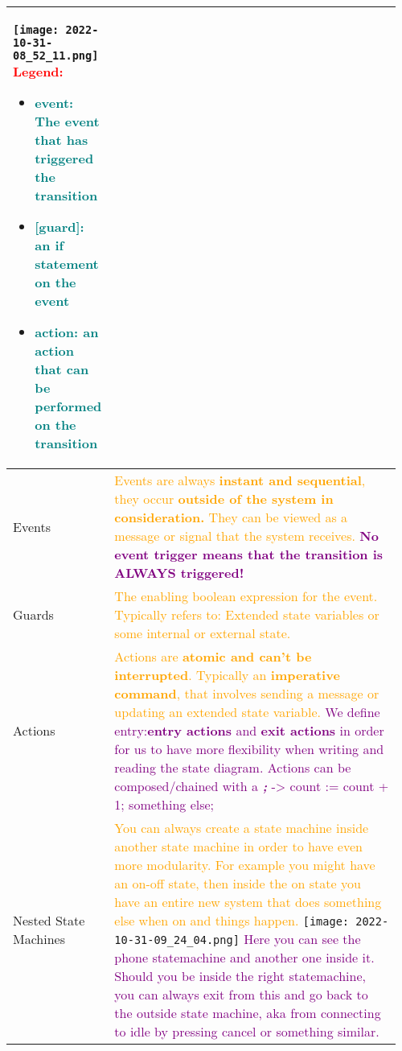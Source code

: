 \documentclass[main.tex,fontsize=8pt,paper=a4,paper=portrait,DIV=calc,]{scrartcl}
\begin{document}
\begin{table}[ht!]
\begin{tabular}{|m{0.2\linewidth}|m{0.755\linewidth}|}
\texttt{[image: 2022-10-31-08\_52\_11.png]}\newline
\textcolor{red}{Legend:}\newline
\begin{itemize}
\item \textcolor{teal}{event: The event that has triggered the transition}
\item \textcolor{teal}{[guard]: an if statement on the event}
\item \textcolor{teal}{action: an action that can be performed on the transition}
\vspace{-3mm}
\end{itemize}\\
\hline
Events & 
\textcolor{orange}{Events are always \textbf{instant and sequential}, they occur \textbf{outside of the system in consideration.}\newline
They can be viewed as a message or signal that the system receives.}\newline
\textcolor{purple}{\textbf{No event trigger means that the transition is ALWAYS triggered!}}\\
\hline
Guards & 
\textcolor{orange}{The enabling boolean expression for the event.\newline
Typically refers to: \newline
Extended state variables or some internal or external state.}
\\
\hline
Actions & 
\textcolor{orange}{Actions are \textbf{atomic and can't be interrupted}.\newline
Typically an \textbf{imperative command}, that involves sending a message or updating an extended state variable.}\newline
\textcolor{purple}{We define entry:\textbf{entry actions} and \textbf{exit actions} in order for us to have more flexibility when writing and reading the state diagram.\newline
Actions can be composed/chained with a \textbf{\textit{;}} -> count := count + 1; something else;}\\
\hline
Nested State Machines & 
\textcolor{orange}{You can always create a state machine inside another state machine in order to have even more modularity.\newline
For example you might have an on-off state, then inside the on state you have an entire new system that does something else when on and things happen.}\newline
\texttt{[image: 2022-10-31-09\_24\_04.png]}\newline
\textcolor{purple}{Here you can see the phone statemachine and another one inside it.\newline
Should you be inside the right statemachine, you can always exit from this and go back to the outside state machine, aka from connecting to idle by pressing cancel or something similar.}\\
\hline
\end{tabular}
\end{table}
\end{document}
